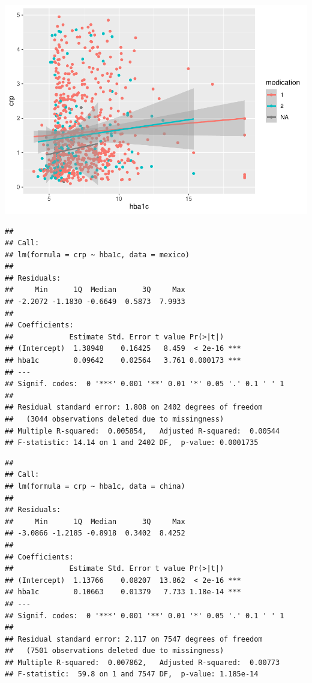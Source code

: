 \documentclass[
  man,floatsintext]{apa6}
\begin{document}
\includegraphics{Final_Groupof5_files/figure-latex/unnamed-chunk-5-1.pdf}

\begin{verbatim}
## 
## Call:
## lm(formula = crp ~ hba1c, data = mexico)
## 
## Residuals:
##     Min      1Q  Median      3Q     Max 
## -2.2072 -1.1830 -0.6649  0.5873  7.9933 
## 
## Coefficients:
##             Estimate Std. Error t value Pr(>|t|)    
## (Intercept)  1.38948    0.16425   8.459  < 2e-16 ***
## hba1c        0.09642    0.02564   3.761 0.000173 ***
## ---
## Signif. codes:  0 '***' 0.001 '**' 0.01 '*' 0.05 '.' 0.1 ' ' 1
## 
## Residual standard error: 1.808 on 2402 degrees of freedom
##   (3044 observations deleted due to missingness)
## Multiple R-squared:  0.005854,   Adjusted R-squared:  0.00544 
## F-statistic: 14.14 on 1 and 2402 DF,  p-value: 0.0001735
\end{verbatim}

\begin{verbatim}
## 
## Call:
## lm(formula = crp ~ hba1c, data = china)
## 
## Residuals:
##     Min      1Q  Median      3Q     Max 
## -3.0866 -1.2185 -0.8918  0.3402  8.4252 
## 
## Coefficients:
##             Estimate Std. Error t value Pr(>|t|)    
## (Intercept)  1.13766    0.08207  13.862  < 2e-16 ***
## hba1c        0.10663    0.01379   7.733 1.18e-14 ***
## ---
## Signif. codes:  0 '***' 0.001 '**' 0.01 '*' 0.05 '.' 0.1 ' ' 1
## 
## Residual standard error: 2.117 on 7547 degrees of freedom
##   (7501 observations deleted due to missingness)
## Multiple R-squared:  0.007862,   Adjusted R-squared:  0.00773 
## F-statistic:  59.8 on 1 and 7547 DF,  p-value: 1.185e-14
\end{verbatim}
\end{document}
